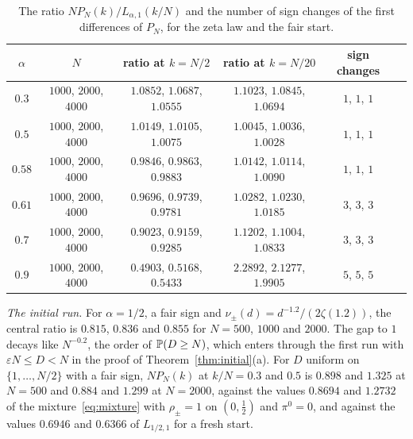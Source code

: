 \begin{table}[t]
\centering
\begin{tabular}{@{}cccccc@{}}
\toprule
$\alpha$ & $N$ & ratio at $k=N/2$ & ratio at $k=N/20$ & sign changes \\
\midrule
$0.3$ & $1000$, $2000$, $4000$ & $1.0852$, $1.0687$, $1.0555$ & $1.1023$, $1.0845$, $1.0694$ & $1$, $1$, $1$\\
$0.5$ & $1000$, $2000$, $4000$ & $1.0149$, $1.0105$, $1.0075$ & $1.0045$, $1.0036$, $1.0028$ & $1$, $1$, $1$\\
$0.58$ & $1000$, $2000$, $4000$ & $0.9846$, $0.9863$, $0.9883$ & $1.0142$, $1.0114$, $1.0090$ & $1$, $1$, $1$\\
$0.61$ & $1000$, $2000$, $4000$ & $0.9696$, $0.9739$, $0.9781$ & $1.0282$, $1.0230$, $1.0185$ & $3$, $3$, $3$\\
$0.7$ & $1000$, $2000$, $4000$ & $0.9023$, $0.9159$, $0.9285$ & $1.1202$, $1.1004$, $1.0833$ & $3$, $3$, $3$\\
$0.9$ & $1000$, $2000$, $4000$ & $0.4903$, $0.5168$, $0.5433$ & $2.2892$, $2.1277$, $1.9905$ & $5$, $5$, $5$\\
\bottomrule
\end{tabular}
\caption{The ratio $NP_N(k)/L_{\alpha,1}(k/N)$ and the number of sign changes of the first
differences of $P_N$, for the zeta law and the fair start.}
\label{tab:ratios}
\end{table}

\emph{The initial run.} For $\alpha=1/2$, a fair sign and $\nu_\pm(d)=d^{-1.2}/(2\zeta(1.2))$,
the central ratio is $0.815$, $0.836$ and $0.855$ for $N=500$, $1000$ and $2000$. The gap to
$1$ decays like $N^{-0.2}$, the order of $\mathbb{P}(D\ge N)$, which enters through the first run
with $\varepsilon N\le D<N$ in the proof of Theorem~\ref{thm:initial}(a). For $D$ uniform on
$\{1,\dots,N/2\}$ with a fair sign, $NP_N(k)$ at $k/N=0.3$ and $0.5$ is $0.898$ and $1.325$ at
$N=500$ and $0.884$ and $1.299$ at $N=2000$, against the values $0.8694$ and $1.2732$ of the
mixture~\eqref{eq:mixture} with $\rho_\pm=1$ on $(0,\frac12)$ and $\pi^0=0$, and against the
values $0.6946$ and $0.6366$ of $L_{1/2,1}$ for a fresh start.

